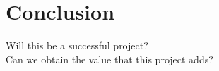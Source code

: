 
\newpage
\section{Conclusion}

Will this be a successful project?\\
Can we obtain the value that this project adds?
